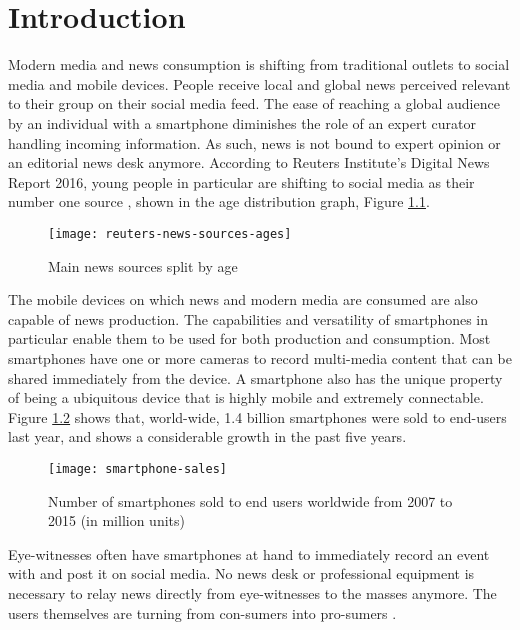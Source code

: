 \chapter{Introduction}\label{ch:intro}
Modern media and news consumption is shifting from traditional outlets to social media and mobile devices.
People receive local and global news perceived relevant to their group on their social media feed.
The ease of reaching a global audience by an individual with a smartphone diminishes the role of an expert curator handling incoming information.
As such, news is not bound to expert opinion or an editorial news desk anymore.
According to Reuters Institute's Digital News Report 2016, young people in particular are shifting to social media as their number one source \cite{reuters_social_media}, shown in the age distribution graph, Figure \ref{fig:reuters-news-sources-ages}.
\begin{figure}[H]
	\centering
	\texttt{[image: reuters-news-sources-ages]}
	\caption{Main news sources split by age \cite{reuters_social_media}}
	\label{fig:reuters-news-sources-ages}
\end{figure}
The mobile devices on which news and modern media are consumed are also capable of news production.
The capabilities and versatility of smartphones in particular enable them to be used for both production and consumption.
Most smartphones have one or more cameras to record multi-media content that can be shared immediately from the device.
A smartphone also has the unique property of being a ubiquitous device that is highly mobile and extremely connectable.
Figure \ref{fig:smartphone-sales} shows that, world-wide, 1.4 billion smartphones were sold to end-users last year, and shows a considerable growth in the past five years.
\begin{figure}[H]
	\centering
	\texttt{[image: smartphone-sales]}
	\caption{Number of smartphones sold to end users worldwide from 2007 to 2015 (in million units) \cite{smartphone-sales}}
	\label{fig:smartphone-sales}
\end{figure}
Eye-witnesses often have smartphones at hand to immediately record an event with and post it on social media.
No news desk or professional equipment is necessary to relay news directly from eye-witnesses to the masses anymore.
The users themselves are turning from con-sumers into pro-sumers \cite{news_crowd}.

